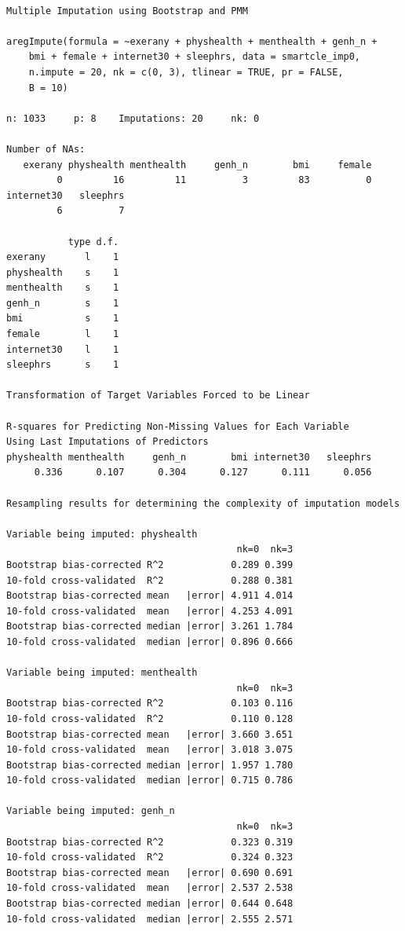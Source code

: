 \documentclass[]{book}
\theoremstyle{definition}
\theoremstyle{definition}
\theoremstyle{definition}
\theoremstyle{remark}
\begin{document}
\begin{verbatim}

Multiple Imputation using Bootstrap and PMM

aregImpute(formula = ~exerany + physhealth + menthealth + genh_n + 
    bmi + female + internet30 + sleephrs, data = smartcle_imp0, 
    n.impute = 20, nk = c(0, 3), tlinear = TRUE, pr = FALSE, 
    B = 10)

n: 1033     p: 8    Imputations: 20     nk: 0 

Number of NAs:
   exerany physhealth menthealth     genh_n        bmi     female 
         0         16         11          3         83          0 
internet30   sleephrs 
         6          7 

           type d.f.
exerany       l    1
physhealth    s    1
menthealth    s    1
genh_n        s    1
bmi           s    1
female        l    1
internet30    l    1
sleephrs      s    1

Transformation of Target Variables Forced to be Linear

R-squares for Predicting Non-Missing Values for Each Variable
Using Last Imputations of Predictors
physhealth menthealth     genh_n        bmi internet30   sleephrs 
     0.336      0.107      0.304      0.127      0.111      0.056 

Resampling results for determining the complexity of imputation models

Variable being imputed: physhealth 
                                         nk=0  nk=3
Bootstrap bias-corrected R^2            0.289 0.399
10-fold cross-validated  R^2            0.288 0.381
Bootstrap bias-corrected mean   |error| 4.911 4.014
10-fold cross-validated  mean   |error| 4.253 4.091
Bootstrap bias-corrected median |error| 3.261 1.784
10-fold cross-validated  median |error| 0.896 0.666

Variable being imputed: menthealth 
                                         nk=0  nk=3
Bootstrap bias-corrected R^2            0.103 0.116
10-fold cross-validated  R^2            0.110 0.128
Bootstrap bias-corrected mean   |error| 3.660 3.651
10-fold cross-validated  mean   |error| 3.018 3.075
Bootstrap bias-corrected median |error| 1.957 1.780
10-fold cross-validated  median |error| 0.715 0.786

Variable being imputed: genh_n 
                                         nk=0  nk=3
Bootstrap bias-corrected R^2            0.323 0.319
10-fold cross-validated  R^2            0.324 0.323
Bootstrap bias-corrected mean   |error| 0.690 0.691
10-fold cross-validated  mean   |error| 2.537 2.538
Bootstrap bias-corrected median |error| 0.644 0.648
10-fold cross-validated  median |error| 2.555 2.571


\end{verbatim}
\end{document}
